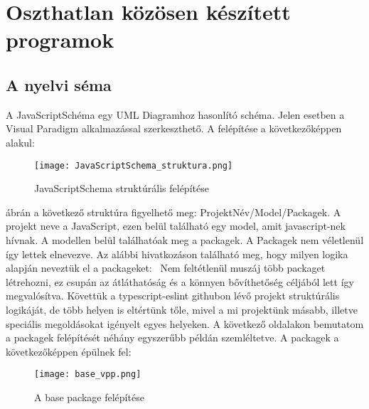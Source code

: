 \chapter{Oszthatlan közösen készített programok}\label{chap:oszthatlan_kozos_dolgok}


\section{A nyelvi séma}

\noindent

A JavaScriptSchéma egy UML Diagramhoz hasonlító schéma. Jelen esetben a Visual Paradigm alkalmazással szerkeszthető.
A felépítése a következőképpen alakul:

\begin{figure}[!htbp]
      \caption{JavaScriptSchema struktúrális felépítése}\label{fig:JavaScriptSchema_struktura}
      \centering
      \texttt{[image: JavaScriptSchema\_struktura.png]}
\end{figure}

 ábrán a következő struktúra figyelhető meg: ProjektNév/Model/Packagek.
A projekt neve a JavaScript, ezen belül található egy model, amit javascript-nek hívnak. A modellen belül találhatóak meg a packagek.
A Packagek nem véletlenül így lettek elnevezve. Az alábbi hivatkozáson található meg, hogy milyen logika alapján neveztük el a packageket:~\cite{typescript-eslint}
Nem feltétlenül muszáj több packaget létrehozni, ez csupán az átláthatóság és a könnyen bővíthetőség céljából lett így megvalósítva.
Követtük a typescript-eslint githubon lévő projekt struktúrális logikáját, de több helyen is eltértünk tőle, mivel a mi projektünk másabb, illetve speciális megoldásokat igényelt egyes helyeken.
A következő oldalakon bemutatom a packagek felépítését néhány egyszerűbb példán szemléltetve.
A packagek a következőképpen épülnek fel:
\begin{figure}[!htbp]
      \caption{A base package felépítése}\label{fig:base_vpp}
      \centering
      \texttt{[image: base\_vpp.png]}
\end{figure}

